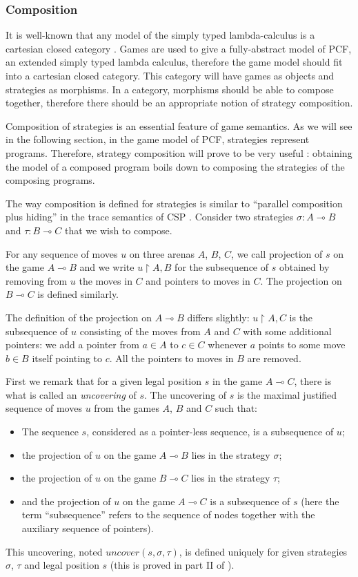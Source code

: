 \subsubsection{Composition}

It is well-known that any model of the simply typed lambda-calculus
is a cartesian closed category \citep{CroleRL:catt}. Games are used
to give a fully-abstract model of PCF, an extended simply typed
lambda calculus, therefore the game model should fit into a
cartesian closed category. This category will have games as objects
and strategies as morphisms. In a category, morphisms should be able
to compose together, therefore there should be an appropriate notion
of strategy composition.

Composition of strategies is an essential feature of game semantics.
As we will see in the following section, in the game model of PCF,
strategies represent programs. Therefore, strategy composition will
prove to be very useful : obtaining the model of a composed program
boils down to composing the strategies of the composing programs.

The way composition is defined for strategies is similar to
``parallel composition plus hiding'' in the trace semantics of CSP
\citep{hoare_csp}. Consider two strategies $\sigma : A \multimap B$
and $\tau : B \multimap C$ that we wish to compose.

For any sequence of moves $u$ on three arenas $A$, $B$, $C$, we call
projection of $s$ on the game $A \multimap B$ and we write $u
\upharpoonright A,B$ for the subsequence of $s$ obtained by removing
from $u$ the moves in $C$ and pointers to moves in $C$. The
projection on $B \multimap C$ is defined similarly.

The definition of the projection on $A \multimap B$ differs
slightly: $u \upharpoonright A,C$ is the subsequence of $u$
consisting of the moves from $A$ and $C$ with some additional
pointers: we add a pointer from $a \in A$ to $c\in C$ whenever $a$
points to some move $b \in B$ itself pointing to $c$. All the
pointers to moves in $B$ are removed.


First we remark that for a given legal position $s$ in the game $A
\multimap C$, there is what is called an \emph{uncovering} of $s$.
The uncovering of $s$ is the maximal justified sequence of moves $u$
from the games $A$, $B$ and $C$ such that:
\begin{itemize}
\item The sequence $s$, considered as a pointer-less sequence, is a subsequence of
$u$;
\item the projection of $u$ on the game $A \multimap B$ lies in the
strategy $\sigma$;
\item the projection of $u$ on the game $B \multimap C$
lies in the strategy $\tau$;
\item and the projection of $u$ on the game $A \multimap C$ is a subsequence of $s$ (here the term ``subsequence'' refers to the sequence of nodes together with the auxiliary sequence of pointers).
\end{itemize}
This uncovering, noted $uncover(s, \sigma, \tau)$, is
defined uniquely for given strategies $\sigma$, $\tau$ and legal
position $s$ (this is proved in part II of \cite{hylandong_pcf}).

